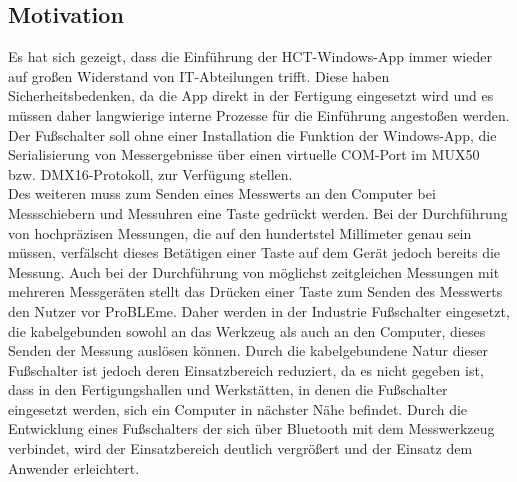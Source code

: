 \subsection{Motivation}
Es hat sich gezeigt, dass die Einführung der \ac{HCT}-Windows-App immer wieder auf großen Widerstand von IT-Abteilungen trifft. Diese haben Sicherheitsbedenken, da die App direkt in der Fertigung eingesetzt wird und es müssen daher langwierige interne Prozesse für die Einführung angestoßen werden. Der Fußschalter soll ohne einer Installation die Funktion der Windows-App, die Serialisierung von Messergebnisse über einen virtuelle COM-Port im MUX50 bzw. DMX16-Protokoll, zur Verfügung stellen. \\
Des weiteren muss zum Senden eines Messwerts an den Computer bei Messschiebern und Messuhren eine Taste gedrückt werden. Bei der Durchführung von hochpräzisen Messungen, die auf den hundertstel Millimeter genau sein müssen, verfälscht dieses Betätigen einer Taste auf dem Gerät jedoch bereits die Messung. Auch bei der Durchführung von möglichst zeitgleichen Messungen mit mehreren Messgeräten stellt das Drücken einer Taste zum Senden des Messwerts den Nutzer vor Pro\ac{BLE}me. Daher werden in der Industrie Fußschalter eingesetzt, die kabelgebunden sowohl an das Werkzeug als auch an den Computer, dieses Senden der Messung auslösen können. Durch die kabelgebundene Natur dieser Fußschalter ist jedoch deren Einsatzbereich reduziert, da es nicht gegeben ist, dass in den Fertigungshallen und Werkstätten, in denen die Fußschalter eingesetzt werden, sich ein Computer in nächster Nähe befindet. Durch die Entwicklung eines Fußschalters der sich über Bluetooth mit dem Messwerkzeug verbindet, wird der Einsatzbereich deutlich vergrößert und der Einsatz dem Anwender erleichtert.